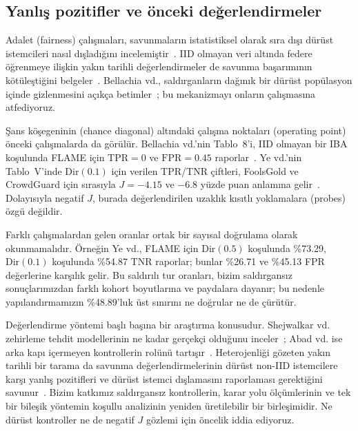 \documentclass[journal]{IEEEtran}
\begin{document}
\subsection{Yanlış pozitifler ve önceki değerlendirmeler}
Adalet (fairness) çalışmaları, savunmaların istatistiksel olarak sıra dışı dürüst istemcileri nasıl dışladığını incelemiştir~\cite{singh2023fair,touat2023bias,ajibuwa2025fairness}. IID olmayan veri altında federe öğrenmeye ilişkin yakın tarihli değerlendirmeler de savunma başarımının kötüleştiğini belgeler~\cite{li2025heterogeneity,ye2025illusion,zhang2025flpoison}. Bellachia vd., saldırganların dağınık bir dürüst popülasyon içinde gizlenmesini açıkça betimler~\cite{bellachia2026sok}; bu mekanizmayı onların çalışmasına atfediyoruz.

Şans köşegeninin (chance diagonal) altındaki çalışma noktaları (operating point) önceki çalışmalarda da görülür. Bellachia vd.'nin Tablo~8'i, IID olmayan bir IBA koşulunda FLAME için $\mathrm{TPR}=0$ ve $\mathrm{FPR}=0.45$ raporlar~\cite{bellachia2026sok}. Ye vd.'nin Tablo~V'inde $\mathrm{Dir}(0.1)$ için verilen TPR/TNR çiftleri, FoolsGold ve CrowdGuard için sırasıyla $J=-4.15$ ve $-6.8$ yüzde puan anlamına gelir~\cite{ye2025illusion}. Dolayısıyla negatif $J$, burada değerlendirilen uzaklık kısıtlı yoklamalara (probes) özgü değildir.

Farklı çalışmalardan gelen oranlar ortak bir sayısal doğrulama olarak okunmamalıdır. Örneğin Ye vd., FLAME için $\mathrm{Dir}(0.5)$ koşulunda \%73.29, $\mathrm{Dir}(0.1)$ koşulunda \%54.87 TNR raporlar; bunlar \%26.71 ve \%45.13 FPR değerlerine karşılık gelir. Bu saldırılı tur oranları, bizim saldırgansız sonuçlarımızdan farklı kohort boyutlarına ve paydalara dayanır; bu nedenle yapılandırmamızın \%48.89'luk üst sınırını ne doğrular ne de çürütür.

Değerlendirme yöntemi başlı başına bir araştırma konusudur. Shejwalkar vd. zehirleme tehdit modellerinin ne kadar gerçekçi olduğunu inceler~\cite{shejwalkar2022drawing}; Abad vd. ise arka kapı içermeyen kontrollerin rolünü tartışır~\cite{abad2025evaluation}. Heterojenliği gözeten yakın tarihli bir tarama da savunma değerlendirmelerinin dürüst non-IID istemcilere karşı yanlış pozitifleri ve dürüst istemci dışlamasını raporlaması gerektiğini savunur~\cite{djemaa2026heterogeneity}. Bizim katkımız saldırgansız kontrollerin, karar yolu ölçümlerinin ve tek bir bileşik yöntemin koşullu analizinin yeniden üretilebilir bir birleşimidir. Ne dürüst kontroller ne de negatif $J$ gözlemi için öncelik iddia ediyoruz.
\end{document}
